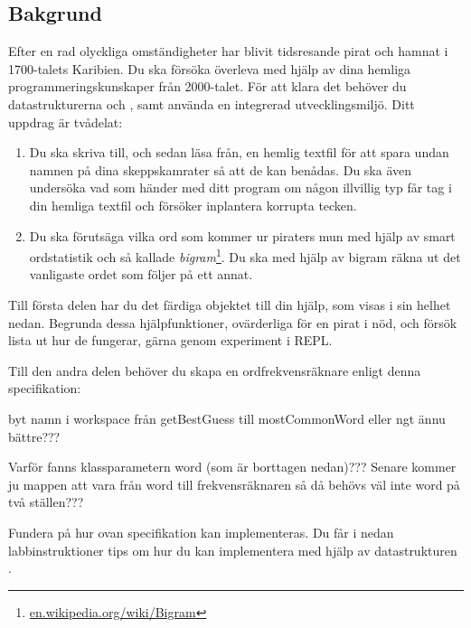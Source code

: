 \subsection{Bakgrund}


Efter en rad olyckliga omständigheter har blivit tidsresande pirat och hamnat i 1700-talets Karibien. Du ska försöka överleva med hjälp av dina hemliga programmeringskunskaper från 2000-talet. För att klara det behöver du datastrukturerna  och , samt använda en integrerad utvecklingsmiljö.
Ditt uppdrag är tvådelat:
\begin{enumerate}
\item Du ska skriva till, och sedan läsa från, en hemlig textfil för att spara undan namnen på dina skeppskamrater så att de kan benådas. Du ska även undersöka vad som händer med ditt program om någon illvillig typ får tag i din hemliga textfil och försöker inplantera korrupta tecken.
\item Du ska förutsäga vilka ord som kommer ur piraters mun med hjälp av smart ordstatistik och så kallade \emph{bigram}\footnote{\href{https://en.wikipedia.org/wiki/Bigram}{en.wikipedia.org/wiki/Bigram}}. Du ska med hjälp av bigram räkna ut det vanligaste ordet som följer på ett annat.  
\end{enumerate}

Till första delen har du det färdiga objektet  till din hjälp, som visas i sin helhet nedan. Begrunda dessa hjälpfunktioner, ovärderliga för en pirat i nöd, och försök lista ut hur de fungerar, gärna genom experiment i REPL.

\noindent Till den andra delen behöver du skapa en ordfrekvensräknare enligt denna specifikation: 

\TODO byt namn i workspace från getBestGuess till mostCommonWord eller ngt ännu bättre???  

\TODO Varför fanns klassparametern word (som är borttagen nedan)??? Senare kommer ju mappen att vara från word till frekvensräknaren så då behövs väl inte word på två ställen???


%    
%    
%    
\noindent Fundera på hur ovan specifikation kan implementeras. Du får i nedan labbinstruktioner tips om hur du kan implementera  med hjälp av datastrukturen .

